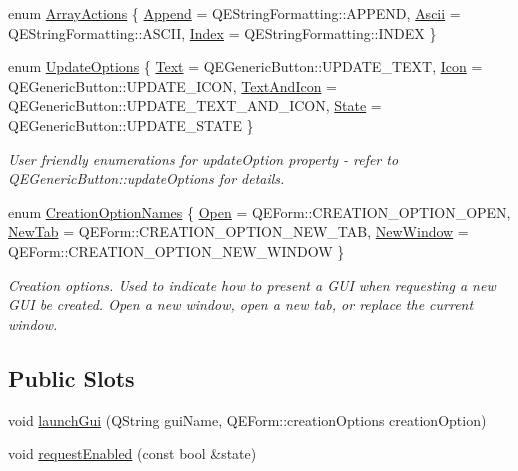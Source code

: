 \begin{DoxyCompactItemize}
enum \hyperlink{classQERadioButton_abeae9bf4f263b0a15d7f8f62abb92e83}{ArrayActions} \{ \hyperlink{classQERadioButton_abeae9bf4f263b0a15d7f8f62abb92e83ac335cb6dea643c6dff4c99498e15202d}{Append} =  QEStringFormatting::APPEND, 
\hyperlink{classQERadioButton_abeae9bf4f263b0a15d7f8f62abb92e83ab4632570722ca47a10d0e81209dda295}{Ascii} =  QEStringFormatting::ASCII, 
\hyperlink{classQERadioButton_abeae9bf4f263b0a15d7f8f62abb92e83adab4c5db37b3a8a48a0221557ad95a04}{Index} =  QEStringFormatting::INDEX
 \}
\item 
enum \hyperlink{classQERadioButton_aad7a7f64f7433389bff79117604e8098}{UpdateOptions} \{ \hyperlink{classQERadioButton_aad7a7f64f7433389bff79117604e8098ab45a72f7df612f2f3b09d57ca12509bd}{Text} =  QEGenericButton::UPDATE\_\-TEXT, 
\hyperlink{classQERadioButton_aad7a7f64f7433389bff79117604e8098a030e45e154656dc0e6f2832c35f82c5b}{Icon} =  QEGenericButton::UPDATE\_\-ICON, 
\hyperlink{classQERadioButton_aad7a7f64f7433389bff79117604e8098aee8dd79029bf966ee3d14e45a894f57f}{TextAndIcon} =  QEGenericButton::UPDATE\_\-TEXT\_\-AND\_\-ICON, 
\hyperlink{classQERadioButton_aad7a7f64f7433389bff79117604e8098a2dc73967404c3b3fd49c0705d3251d2d}{State} =  QEGenericButton::UPDATE\_\-STATE
 \}
\begin{DoxyCompactList}\small\item\em User friendly enumerations for updateOption property -\/ refer to QEGenericButton::updateOptions for details. \end{DoxyCompactList}\item 
enum \hyperlink{classQERadioButton_acb27e9a0a6626e356c5da293352c41c6}{CreationOptionNames} \{ \hyperlink{classQERadioButton_acb27e9a0a6626e356c5da293352c41c6a20be17f8b2d3e576e1e06f8e26f3de00}{Open} =  QEForm::CREATION\_\-OPTION\_\-OPEN, 
\hyperlink{classQERadioButton_acb27e9a0a6626e356c5da293352c41c6afa5686675b0bd0fbb273ad162182988a}{NewTab} =  QEForm::CREATION\_\-OPTION\_\-NEW\_\-TAB, 
\hyperlink{classQERadioButton_acb27e9a0a6626e356c5da293352c41c6a39f46039ea158ab5178a8b1e44662df5}{NewWindow} =  QEForm::CREATION\_\-OPTION\_\-NEW\_\-WINDOW
 \}
\begin{DoxyCompactList}\small\item\em Creation options. Used to indicate how to present a GUI when requesting a new GUI be created. Open a new window, open a new tab, or replace the current window. \end{DoxyCompactList}\end{DoxyCompactItemize}
\subsection*{Public Slots}
\begin{DoxyCompactItemize}
\item 
void \hyperlink{classQERadioButton_aaba01dbffcad0c61b1999d1674fdff52}{launchGui} (QString guiName, QEForm::creationOptions creationOption)
\item 
void \hyperlink{classQERadioButton_aff270fc5ca21614928ef8c21a56c922f}{requestEnabled} (const bool \&state)
\end{DoxyCompactItemize}
